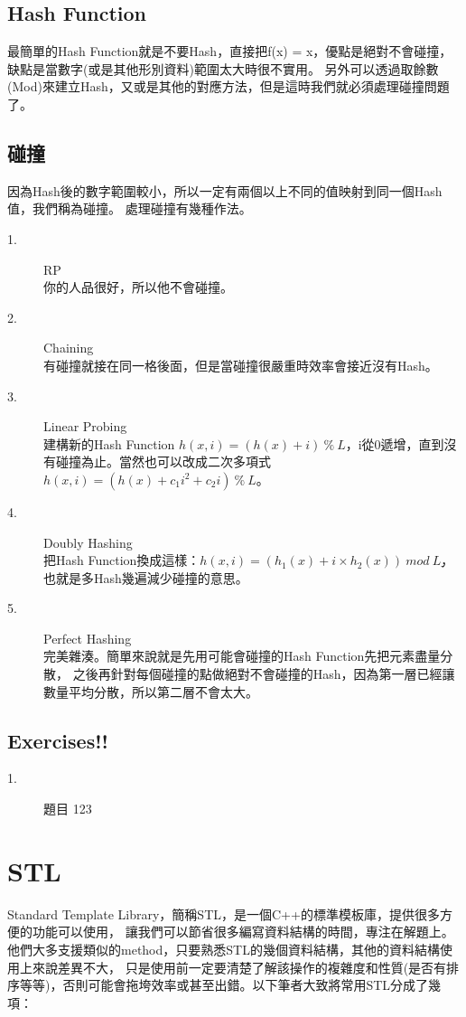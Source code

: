 \documentclass{article}
\begin{document}
\subsection{Hash Function}
最簡單的Hash Function就是不要Hash，直接把f(x) = x，優點是絕對不會碰撞，
缺點是當數字(或是其他形別資料)範圍太大時很不實用。
另外可以透過取餘數(Mod)來建立Hash，又或是其他的對應方法，但是這時我們就必須處理碰撞問題了。

\subsection{碰撞}
因為Hash後的數字範圍較小，所以一定有兩個以上不同的值映射到同一個Hash值，我們稱為碰撞。
處理碰撞有幾種作法。
\begin{description}
\item[ 1.]RP\\
你的人品很好，所以他不會碰撞。
\item[ 2.]Chaining\\
有碰撞就接在同一格後面，但是當碰撞很嚴重時效率會接近沒有Hash。
\item[ 3.]Linear Probing\\
建構新的Hash Function $h(x, i) = (h(x) + i)\ \%\ L$，i從0遞增，直到沒有碰撞為止。當然也可以改成二次多項式$h(x, i) = (h(x) + c_1 i^2 + c_2 i)\ \%\ L$。
\item[ 4.]Doubly Hashing\\
把Hash Function換成這樣：$ h(x, i) = (h_1 (x) + i × h_2 (x))\ mod\ Lׇ$，也就是多Hash幾遍減少碰撞的意思。

\item[ 5.]Perfect Hashing\\
完美雜湊。簡單來說就是先用可能會碰撞的Hash Function先把元素盡量分散，
之後再針對每個碰撞的點做絕對不會碰撞的Hash，因為第一層已經讓數量平均分散，所以第二層不會太大。
\end{description}

\subsection{Exercises!!}
\begin{description}
\item[ 1.]題目
123
\end{description}

\section{STL}
Standard Template Library，簡稱STL，是一個C++的標準模板庫，提供很多方便的功能可以使用，
讓我們可以節省很多編寫資料結構的時間，專注在解題上。
他們大多支援類似的method，只要熟悉STL的幾個資料結構，其他的資料結構使用上來說差異不大，
只是使用前一定要清楚了解該操作的複雜度和性質(是否有排序等等)，否則可能會拖垮效率或甚至出錯。以下筆者大致將常用STL分成了幾項：
\end{document}
